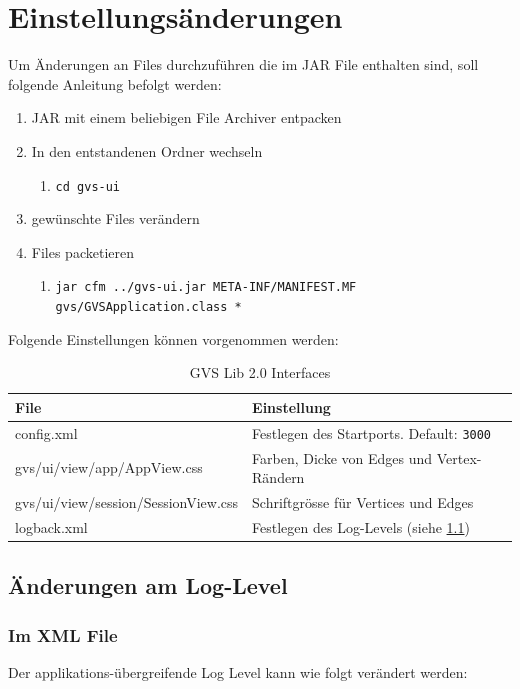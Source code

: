 \documentclass[11pt,a4paper,english,oneside]{book}
\numberwithin{equation}{chapter}
\begin{document}
	\section{Einstellungsänderungen}
	Um Änderungen an Files durchzuführen die im JAR File enthalten sind, soll folgende Anleitung befolgt werden:
	
	\begin{enumerate}
		\item JAR mit einem beliebigen File Archiver entpacken
		\item In den entstandenen Ordner wechseln
		\begin{enumerate}
			\item \lstinline{cd gvs-ui}
		\end{enumerate}
		\item gewünschte Files verändern
		\item Files packetieren
		\begin{enumerate}
			\item \lstinline{jar cfm ../gvs-ui.jar META-INF/MANIFEST.MF gvs/GVSApplication.class *}
		\end{enumerate}
	\end{enumerate}

	Folgende Einstellungen können vorgenommen werden:
	
		\begin{table}[h!]
		\centering
		\begin{tabularx}{\linewidth}{l X}
			\toprule 
			File & Einstellung \\
			\midrule
			config.xml & Festlegen des Startports. Default: \lstinline{3000} \\
			gvs/ui/view/app/AppView.css & Farben, Dicke von Edges und Vertex-Rändern\\
			gvs/ui/view/session/SessionView.css & Schriftgrösse für Vertices und Edges\\
			logback.xml & Festlegen des Log-Levels (siehe \ref{ssec:logger})\\
			\bottomrule 
		\end{tabularx} 
		\caption{GVS Lib 2.0 Interfaces} 
		\label{tbl:preferences}
	\end{table}
	
	\subsection{Änderungen am Log-Level} \label{ssec:logger}
	\subsubsection{Im XML File}
	Der applikations-übergreifende Log Level kann wie folgt verändert werden:
	
\end{document}
